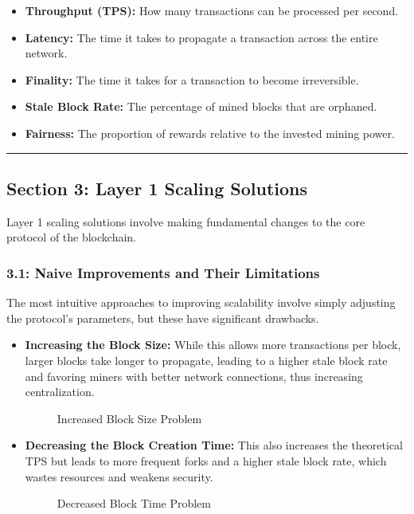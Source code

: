 \begin{itemize}
\tightlist
\item
  \textbf{Throughput (TPS):} How many transactions can be processed per
  second.
\item
  \textbf{Latency:} The time it takes to propagate a transaction across
  the entire network.
\item
  \textbf{Finality:} The time it takes for a transaction to become
  irreversible.
\item
  \textbf{Stale Block Rate:} The percentage of mined blocks that are
  orphaned.
\item
  \textbf{Fairness:} The proportion of rewards relative to the invested
  mining power.
\end{itemize}

\begin{center}\rule{0.5\linewidth}{0.5pt}\end{center}

\subsection{Section 3: Layer 1 Scaling
Solutions}\label{section-3-layer-1-scaling-solutions}

Layer 1 scaling solutions involve making fundamental changes to the core
protocol of the blockchain.

\subsubsection{3.1: Naive Improvements and Their
Limitations}\label{naive-improvements-and-their-limitations}

The most intuitive approaches to improving scalability involve simply
adjusting the protocol's parameters, but these have significant
drawbacks.

\begin{itemize}
\item
  \textbf{Increasing the Block Size:} While this allows more
  transactions per block, larger blocks take longer to propagate,
  leading to a higher stale block rate and favoring miners with better
  network connections, thus increasing centralization.

  \begin{figure}
  \centering
  \caption{Increased Block Size Problem}
  \end{figure}
\item
  \textbf{Decreasing the Block Creation Time:} This also increases the
  theoretical TPS but leads to more frequent forks and a higher stale
  block rate, which wastes resources and weakens security.

  \begin{figure}
  \centering
  \caption{Decreased Block Time Problem}
  \end{figure}
\end{itemize}

